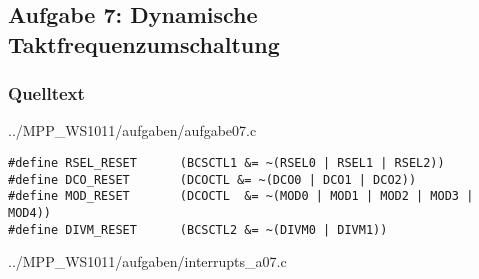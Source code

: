 \subsection*{Aufgabe 7: Dynamische Taktfrequenzumschaltung}
\subsubsection*{Quelltext}


{../MPP_WS1011/aufgaben/aufgabe07.c}

\begin{lstlisting}[caption=Macros]
#define RSEL_RESET      (BCSCTL1 &= ~(RSEL0 | RSEL1 | RSEL2))
#define DCO_RESET       (DCOCTL &= ~(DCO0 | DCO1 | DCO2))
#define MOD_RESET       (DCOCTL  &= ~(MOD0 | MOD1 | MOD2 | MOD3 | MOD4))
#define DIVM_RESET      (BCSCTL2 &= ~(DIVM0 | DIVM1))
\end{lstlisting}


{../MPP_WS1011/aufgaben/interrupts_a07.c}

